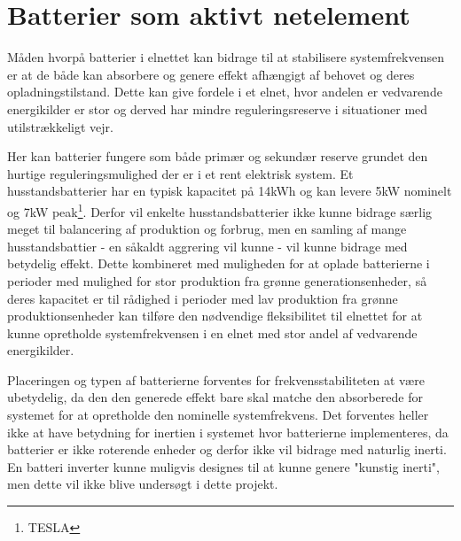 \section{Batterier som aktivt netelement}

Måden hvorpå batterier i elnettet kan bidrage til at stabilisere systemfrekvensen er at de både kan absorbere og genere effekt afhængigt af behovet og deres opladningstilstand. Dette kan give fordele i et elnet, hvor andelen er vedvarende energikilder er stor og derved har mindre reguleringsreserve i situationer med utilstrækkeligt vejr.

Her kan batterier fungere som både primær og sekundær reserve grundet den hurtige reguleringsmulighed der er i et rent elektrisk system. Et husstandsbatterier har en typisk kapacitet på 14kWh og kan levere 5kW nominelt og 7kW peak\footnote{TESLA}. Derfor vil enkelte husstandsbatterier ikke kunne bidrage særlig meget til balancering af produktion og forbrug, men en samling af mange husstandsbattier - en såkaldt aggrering vil kunne - vil kunne bidrage med betydelig effekt. Dette kombineret med muligheden for at oplade batterierne i perioder med mulighed for stor produktion fra grønne generationsenheder, så deres kapacitet er til rådighed i perioder med lav produktion fra grønne produktionsenheder kan tilføre den nødvendige fleksibilitet til elnettet for at kunne opretholde systemfrekvensen i en elnet med stor andel af vedvarende energikilder.

Placeringen og typen af batterierne forventes for frekvensstabiliteten at være ubetydelig, da den den generede effekt bare skal matche den absorberede for systemet for at opretholde den nominelle systemfrekvens. Det forventes heller ikke at have betydning for inertien i systemet hvor batterierne implementeres, da batterier er ikke roterende enheder og derfor ikke vil bidrage med naturlig inerti. En batteri inverter kunne muligvis designes til at kunne genere "kunstig inerti", men dette vil ikke blive undersøgt i dette projekt.


